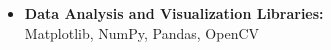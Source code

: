 \documentclass[12pt]{article}
\begin{document}
\begin{itemize}
\begin{itemize}
		\item \textbf{Data Analysis and Visualization Libraries:}\\
		Matplotlib, NumPy, Pandas, OpenCV
	

\end{itemize}
\end{itemize}
\end{document}
